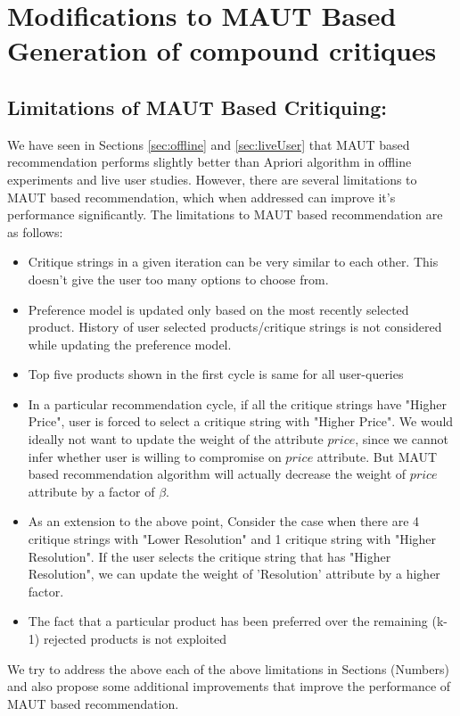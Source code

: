 \chapter{Modifications to MAUT Based Generation of compound critiques}
\label{chap:modifications}
\section{Limitations of MAUT Based Critiquing:}

We have seen in Sections \ref{sec:offline} and \ref{sec:liveUser} that MAUT based recommendation performs slightly better than Apriori algorithm in offline experiments and live user studies.
However, there are several limitations to MAUT based recommendation, which when addressed can improve it's performance significantly.
The limitations to MAUT based recommendation are as follows:
\begin{itemize}
\item Critique strings in a given iteration can be very similar to each other. This doesn't give the user too many options to choose from.
\item Preference model is updated only based on the most recently selected product. History of user selected products/critique strings is not considered while updating the preference model.
\item Top five products shown in the first cycle is same for all user-queries
\item In a particular recommendation cycle, if all the critique strings have "Higher Price", user is forced to select a critique string with "Higher Price". We would ideally not want to update the weight of the attribute $price$, since we cannot infer whether user is willing to compromise on $price$ attribute. But MAUT based recommendation algorithm will actually decrease the weight of $price$ attribute by a factor of $\beta$.
\item As an extension to the above point, Consider the case when there are 4 critique strings with "Lower Resolution" and 1 critique string with "Higher Resolution". If the user selects the critique string that has "Higher Resolution", we can update  the weight of 'Resolution' attribute by a higher factor.
\item The fact that a particular product has been preferred over the remaining (k-1) rejected products is not exploited

\end{itemize}
We try to address the above each of the above limitations in Sections (Numbers) and also propose some additional improvements that improve the performance of MAUT based recommendation.









